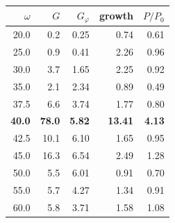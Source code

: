 \begin{tabular}{@{}rrrrr@{}}
\toprule
$\omega$ & $G$ & $G_\varphi$ & growth & $P/P_0$\\ \midrule
20.0 & 0.2 & 0.25 & 0.74 & 0.61\\
25.0 & 0.9 & 0.41 & 2.26 & 0.96\\
30.0 & 3.7 & 1.65 & 2.25 & 0.92\\
35.0 & 2.1 & 2.34 & 0.89 & 0.49\\
37.5 & 6.6 & 3.74 & 1.77 & 0.80\\
\bf 40.0 & \bf 78.0 & \bf 5.82 & \bf 13.41 & \bf 4.13\\
42.5 & 10.1 & 6.10 & 1.65 & 0.95\\
45.0 & 16.3 & 6.54 & 2.49 & 1.28\\
50.0 & 5.5 & 6.01 & 0.91 & 0.70\\
55.0 & 5.7 & 4.27 & 1.34 & 0.91\\
60.0 & 5.8 & 3.71 & 1.58 & 1.08\\
\bottomrule
\end{tabular}
